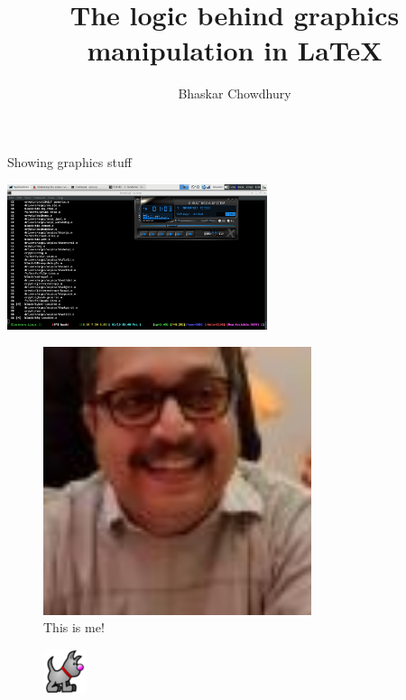 \documentclass{article}
\author{Bhaskar Chowdhury}
\title{The logic behind graphics manipulation in {\LaTeX}}
\begin{document}
\maketitle

Showing graphics stuff

\begin{center}	
\includegraphics[width=3in]{kernel.compile.png}
\end{center}

\blindtext

\begin{figure}[t]
	\centering
\includegraphics[width=0.7\textwidth]{bhaskar.jpeg}
\caption{This is me!}
\end{figure}

\blindtext

\blindtext

\blindtext

\begin{figure}
	\includegraphics{neomutt.png}
\end{figure}

\blindtext


\blindtext
\end{document}
